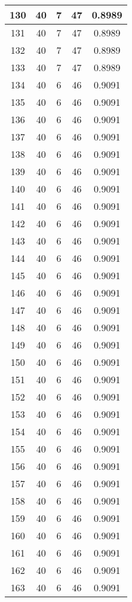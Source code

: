 \documentclass[letterpaper, 12pt]{article}
\begin{document}
\begin{longtable}{|c|c|c|c|c|}
\hline
130 & 40 & 7 & 47 & 0.8989 \\
\hline
131 & 40 & 7 & 47 & 0.8989 \\
\hline
132 & 40 & 7 & 47 & 0.8989 \\
\hline
133 & 40 & 7 & 47 & 0.8989 \\
\hline
134 & 40 & 6 & 46 & 0.9091 \\
\hline
135 & 40 & 6 & 46 & 0.9091 \\
\hline
136 & 40 & 6 & 46 & 0.9091 \\
\hline
137 & 40 & 6 & 46 & 0.9091 \\
\hline
138 & 40 & 6 & 46 & 0.9091 \\
\hline
139 & 40 & 6 & 46 & 0.9091 \\
\hline
140 & 40 & 6 & 46 & 0.9091 \\
\hline
141 & 40 & 6 & 46 & 0.9091 \\
\hline
142 & 40 & 6 & 46 & 0.9091 \\
\hline
143 & 40 & 6 & 46 & 0.9091 \\
\hline
144 & 40 & 6 & 46 & 0.9091 \\
\hline
145 & 40 & 6 & 46 & 0.9091 \\
\hline
146 & 40 & 6 & 46 & 0.9091 \\
\hline
147 & 40 & 6 & 46 & 0.9091 \\
\hline
148 & 40 & 6 & 46 & 0.9091 \\
\hline
149 & 40 & 6 & 46 & 0.9091 \\
\hline
150 & 40 & 6 & 46 & 0.9091 \\
\hline
151 & 40 & 6 & 46 & 0.9091 \\
\hline
152 & 40 & 6 & 46 & 0.9091 \\
\hline
153 & 40 & 6 & 46 & 0.9091 \\
\hline
154 & 40 & 6 & 46 & 0.9091 \\
\hline
155 & 40 & 6 & 46 & 0.9091 \\
\hline
156 & 40 & 6 & 46 & 0.9091 \\
\hline
157 & 40 & 6 & 46 & 0.9091 \\
\hline
158 & 40 & 6 & 46 & 0.9091 \\
\hline
159 & 40 & 6 & 46 & 0.9091 \\
\hline
160 & 40 & 6 & 46 & 0.9091 \\
\hline
161 & 40 & 6 & 46 & 0.9091 \\
\hline
162 & 40 & 6 & 46 & 0.9091 \\
\hline
163 & 40 & 6 & 46 & 0.9091 \\

\end{longtable}
\end{document}
